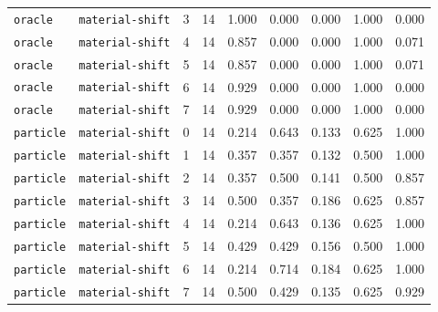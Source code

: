 \documentclass{article}
\begin{document}
\begin{center}
\begin{tabular}{llccccccc}
\texttt{oracle} & \texttt{material-shift} & 3 & 14 & 1.000 & 0.000 & 0.000 & 1.000 & 0.000 \\
\texttt{oracle} & \texttt{material-shift} & 4 & 14 & 0.857 & 0.000 & 0.000 & 1.000 & 0.071 \\
\texttt{oracle} & \texttt{material-shift} & 5 & 14 & 0.857 & 0.000 & 0.000 & 1.000 & 0.071 \\
\texttt{oracle} & \texttt{material-shift} & 6 & 14 & 0.929 & 0.000 & 0.000 & 1.000 & 0.000 \\
\texttt{oracle} & \texttt{material-shift} & 7 & 14 & 0.929 & 0.000 & 0.000 & 1.000 & 0.000 \\
\texttt{particle} & \texttt{material-shift} & 0 & 14 & 0.214 & 0.643 & 0.133 & 0.625 & 1.000 \\
\texttt{particle} & \texttt{material-shift} & 1 & 14 & 0.357 & 0.357 & 0.132 & 0.500 & 1.000 \\
\texttt{particle} & \texttt{material-shift} & 2 & 14 & 0.357 & 0.500 & 0.141 & 0.500 & 0.857 \\
\texttt{particle} & \texttt{material-shift} & 3 & 14 & 0.500 & 0.357 & 0.186 & 0.625 & 0.857 \\
\texttt{particle} & \texttt{material-shift} & 4 & 14 & 0.214 & 0.643 & 0.136 & 0.625 & 1.000 \\
\texttt{particle} & \texttt{material-shift} & 5 & 14 & 0.429 & 0.429 & 0.156 & 0.500 & 1.000 \\
\texttt{particle} & \texttt{material-shift} & 6 & 14 & 0.214 & 0.714 & 0.184 & 0.625 & 1.000 \\
\texttt{particle} & \texttt{material-shift} & 7 & 14 & 0.500 & 0.429 & 0.135 & 0.625 & 0.929 \\
\bottomrule
\end{tabular}
\end{center}
\end{document}
